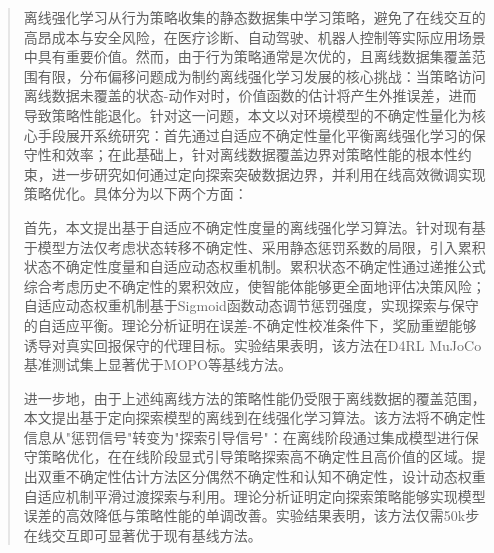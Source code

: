 \begin{abstract}
  离线强化学习从行为策略收集的静态数据集中学习策略，避免了在线交互的高昂成本与安全风险，在医疗诊断、自动驾驶、机器人控制等实际应用场景中具有重要价值。然而，由于行为策略通常是次优的，且离线数据集覆盖范围有限，分布偏移问题成为制约离线强化学习发展的核心挑战：当策略访问离线数据未覆盖的状态-动作对时，价值函数的估计将产生外推误差，进而导致策略性能退化。针对这一问题，本文以对环境模型的不确定性量化为核心手段展开系统研究：首先通过自适应不确定性量化平衡离线强化学习的保守性和效率；在此基础上，针对离线数据覆盖边界对策略性能的根本性约束，进一步研究如何通过定向探索突破数据边界，并利用在线高效微调实现策略优化。具体分为以下两个方面：

  首先，本文提出基于自适应不确定性度量的离线强化学习算法。针对现有基于模型方法仅考虑状态转移不确定性、采用静态惩罚系数的局限，引入累积状态不确定性度量和自适应动态权重机制。累积状态不确定性通过递推公式综合考虑历史不确定性的累积效应，使智能体能够更全面地评估决策风险；自适应动态权重机制基于Sigmoid函数动态调节惩罚强度，实现探索与保守的自适应平衡。理论分析证明在误差-不确定性校准条件下，奖励重塑能够诱导对真实回报保守的代理目标。实验结果表明，该方法在D4RL MuJoCo基准测试集上显著优于MOPO等基线方法。

  进一步地，由于上述纯离线方法的策略性能仍受限于离线数据的覆盖范围，本文提出基于定向探索模型的离线到在线强化学习算法。该方法将不确定性信息从"惩罚信号"转变为"探索引导信号"：在离线阶段通过集成模型进行保守策略优化，在在线阶段显式引导策略探索高不确定性且高价值的区域。提出双重不确定性估计方法区分偶然不确定性和认知不确定性，设计动态权重自适应机制平滑过渡探索与利用。理论分析证明定向探索策略能够实现模型误差的高效降低与策略性能的单调改善。实验结果表明，该方法仅需50k步在线交互即可显著优于现有基线方法。


\end{abstract}

















